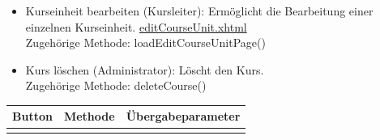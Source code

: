 \begin{itemize}
\begin{itemize}
				\item Kurseinheit bearbeiten (Kursleiter): Ermöglicht die Bearbeitung einer einzelnen Kurseinheit. \hyperlink{editCourseUnit}{editCourseUnit.xhtml} \\ Zugehörige Methode: loadEditCourseUnitPage()
				\item Kurs löschen (Administrator): Löscht den Kurs. \\ Zugehörige Methode: deleteCourse()
			\end{itemize}
			\begin{center}
				\begin{longtable}{|p{4cm} |p{6cm} | p{4cm}|}
						
					\hline \multicolumn{1}{|c|}{\textbf{Button}} & \multicolumn{1}{|c|}{\textbf{Methode}} & \multicolumn{1}{|c|}{\textbf{\"{U}bergabeparameter}} \\ \hline
					\endfirsthead
					\hline
					\endlastfoot
			

\end{longtable}
\end{center}
\end{itemize}
